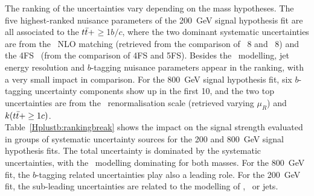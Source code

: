 The ranking of the uncertainties vary depending on the mass hypotheses. The five highest-ranked nuisance parameters of the 200~GeV signal hypothesis fit are all associated to the $t\bar{t}+$$\geq$1$b/c$, where the two dominant systematic uncertainties are from the \ttb\ NLO matching (retrieved from the comparison of \MGMCatNLOPYTHIA~8 and \POWHEGPYTHIA~8) and the 4FS \ttb\ (from the comparison of 4FS and 5FS). Besides the \ttbar\ modelling, jet energy resolution and $b$-tagging nuisance parameters appear in the ranking, with a very small impact in comparison. For the 800~GeV signal hypothesis fit, six $b$-tagging uncertainty components show up in the first 10, and the two top uncertainties are from the \ttb\ renormalisation scale (retrieved varying $\mu_R$) and $k(t\bar{t}+\geq1c)$.\\

Table~\ref{Hplustb:rankingbreak} shows the impact on the signal strength evaluated in groups of systematic uncertainty sources for the 200 and 800~GeV signal hypothesis fits. The total uncertainty is dominated by the systematic uncertainties, with the \ttb\ modelling dominating for both masses. For the 800~GeV fit, the $b$-tagging related uncertainties play also a leading role. For the 200~GeV fit, the sub-leading uncertainties are related to the modelling of \ttc, \ttl\ or jets.\\

